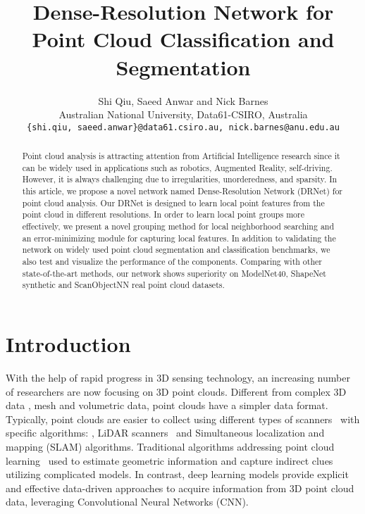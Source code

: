 \documentclass[10pt,twocolumn,letterpaper]{article}
\begin{document}
\title{Dense-Resolution Network for Point Cloud Classification and Segmentation}



\author{Shi Qiu, Saeed Anwar and Nick Barnes\\
 Australian National University, Data61-CSIRO, Australia\\
{\tt\small \{shi.qiu, saeed.anwar\}@data61.csiro.au, nick.barnes@anu.edu.au}
}

\maketitle


\begin{abstract}
Point cloud analysis is attracting attention from Artificial Intelligence research since it can be widely used in applications such as robotics, Augmented Reality, self-driving. However, it is always challenging due to irregularities, unorderedness, and sparsity. In this article, we propose a novel network named Dense-Resolution Network (DRNet) for point cloud analysis. Our DRNet is designed to learn local point features from the point cloud in different resolutions. In order to learn local point groups more effectively, we present a novel grouping method for local neighborhood searching and an error-minimizing module for capturing local features. In addition to validating the network on widely used point cloud segmentation and classification benchmarks, we also test and visualize the performance of the components. Comparing with other state-of-the-art methods, our network shows superiority on ModelNet40, ShapeNet synthetic and ScanObjectNN real point cloud datasets.
\end{abstract}

\section{Introduction}
\label{sec:intro}
With the help of rapid progress in 3D sensing technology, an increasing number of researchers are now focusing on 3D point clouds. Different from complex 3D data \eg, mesh and volumetric data, point clouds have a simpler data format. Typically, point clouds are easier to collect using different types of scanners~\cite{blais2004review} with specific algorithms: \eg, LiDAR scanners~\cite{jaboyedoff2012use} and Simultaneous localization and mapping (SLAM) algorithms. Traditional algorithms addressing point cloud learning~\cite{schnabel2007efficient,mitra2004registration,rusu2009fast,vosselman20013d} used to estimate geometric information and capture indirect clues utilizing complicated models. In contrast, deep learning models provide explicit and effective data-driven approaches to acquire information from 3D point cloud data, leveraging Convolutional Neural Networks (CNN).
\end{document}
